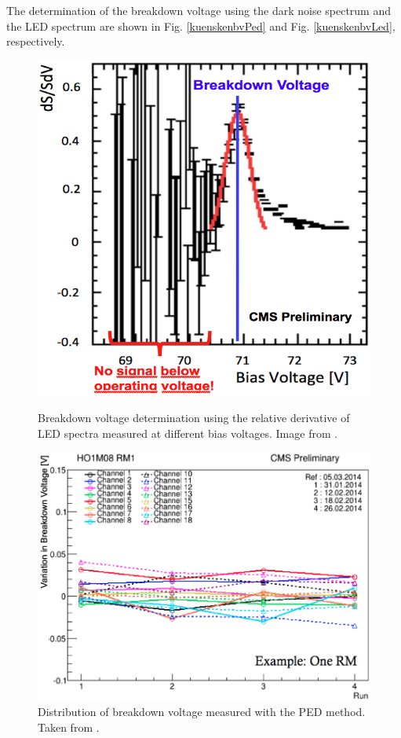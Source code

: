The determination of the breakdown voltage using the dark noise spectrum and the LED spectrum are shown in Fig. \ref{kuenskenbvPed} and Fig. \ref{kuenskenbvLed}, respectively.
\begin{figure}[h]
\centering
\begin{minipage}[t]{0.39\textwidth}
\includegraphics[width=\textwidth]{Figures/kuensken/bvLedScaled.png}
\caption{Breakdown voltage determination using the relative derivative of LED spectra measured at different bias voltages. Image from \cite{kuenskenCalor}.}
\label{kuenskenbvLed}
\end{minipage}
\hspace{0.5cm}
\begin{minipage}[t]{0.56\textwidth}
\includegraphics[width=\textwidth]{Figures/kuensken/bvOverTime.png}
\caption{Distribution of breakdown voltage measured with the PED method. Taken from \cite{kuenskenCalor}.}
\label{kuenskenbvVsTime}
\end{minipage}
\end{figure}
